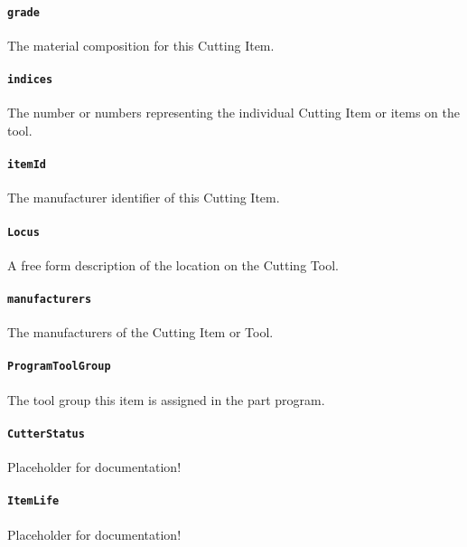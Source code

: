 \paragraph{\texttt{grade}}\mbox{}
\newline\tab The material composition for this Cutting Item.


\paragraph{\texttt{indices}}\mbox{}
\newline\tab The number or numbers representing the individual Cutting Item or items on the tool.


\paragraph{\texttt{itemId}}\mbox{}
\newline\tab The manufacturer identifier of this Cutting Item.

\paragraph{\texttt{Locus}}\mbox{}
\newline\tab A free form description of the location on the Cutting Tool.

\paragraph{\texttt{manufacturers}}\mbox{}
\newline\tab The manufacturers of the Cutting Item or Tool.

\paragraph{\texttt{ProgramToolGroup}}\mbox{}
\newline\tab The tool group this item is assigned in the part program.

\paragraph{\texttt{CutterStatus}}\mbox{}
\newline\tab Placeholder for documentation!

\paragraph{\texttt{ItemLife}}\mbox{}
\newline\tab Placeholder for documentation!

